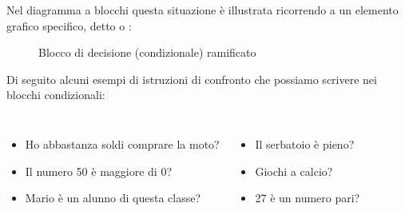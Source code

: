 \documentclass[
    notheorems,
    11pt,
    compress,
    aspectratio=169
]{beamer}
\begin{document}
\begin{frame}

    Nel diagramma a blocchi questa situazione è illustrata ricorrendo a un elemento grafico specifico, detto  o :

    \pause

    \begin{figure}[htbp]
        \centering

        
        \caption{Blocco di decisione (condizionale) ramificato}
        \label{fig:11}
    \end{figure}
\end{frame}

\begin{frame}

    Di seguito alcuni esempi di istruzioni di confronto che possiamo scrivere nei blocchi condizionali:

    \vspace{\baselineskip}

    \begin{columns}
            \begin{itemize}
                \item Ho abbastanza soldi comprare la moto?
                \item Il numero 50 è maggiore di 0?
                \item Mario è un alunno di questa classe?
            \end{itemize}

            \begin{itemize}
                \item Il serbatoio è pieno?
                \item Giochi a calcio?
                \item 27 è un numero pari?
            \end{itemize}
    \end{columns}
\end{frame}
\end{document}
